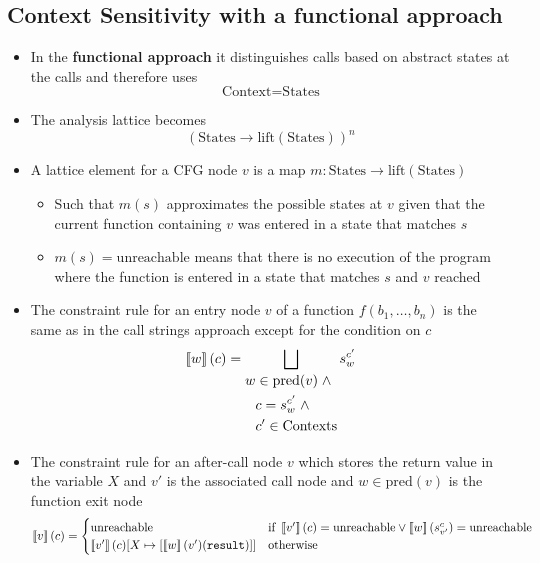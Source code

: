 \subsection{Context Sensitivity with a functional approach}
\begin{itemize}
  \item In the \textbf{functional approach} it distinguishes calls based on abstract states at the calls and therefore uses
  \begin{equation*}
    \text{Context} = \text{States}
  \end{equation*}
  \item The analysis lattice becomes
  \begin{equation*}
    (\text{States} \rightarrow \text{lift}(\text{States}))^n 
  \end{equation*}	
  \item A lattice element for a CFG node $v$ is a map $m: \text{States} \rightarrow \text{lift}(\text{States})$
  \begin{itemize}
    \item Such that $m(s)$ approximates the possible states at $v$ given that the current function containing $v$ was entered in a state that matches $s$
    \item $m(s) = \text{unreachable}$ means that there is no execution of the program where the function is entered in a state that matches $s$ and $v$ reached
  \end{itemize}
  \item The constraint rule for an entry node $v$ of a function $f(b_1, \dots, b_n)$ is the same as in the call strings approach except for the condition on $c$ 
  \begin{equation*}
    \left\llbracket w\right\rrbracket(c) = \bigsqcup_{\begin{aligned} w & \in \text{pred}(v) \; \land \\ & c = s_w^{c'} \; \land \\  & c' \in \text{Contexts} \end{aligned}} s_w^{c'}
  \end{equation*}
  \item The constraint rule for an after-call node $v$ which stores the return value in the variable $X$ and $v'$ is the associated call node and $w \in \text{pred}(v)$ is the function exit node
  \begin{equation*}
    \left\llbracket v\right\rrbracket(c) = 
    \begin{cases} 
      \text{unreachable} & \text{if } \left\llbracket v'\right\rrbracket(c) = \text{unreachable} \lor \left\llbracket w\right\rrbracket(s_{v'}^c) = \text{unreachable} \\
      \left\llbracket v'\right\rrbracket(c)[X \mapsto [\left\llbracket w\right\rrbracket(v')(\mathtt{result})]] & \text{otherwise}
    \end{cases}
  \end{equation*}
\end{itemize}

\newpage

